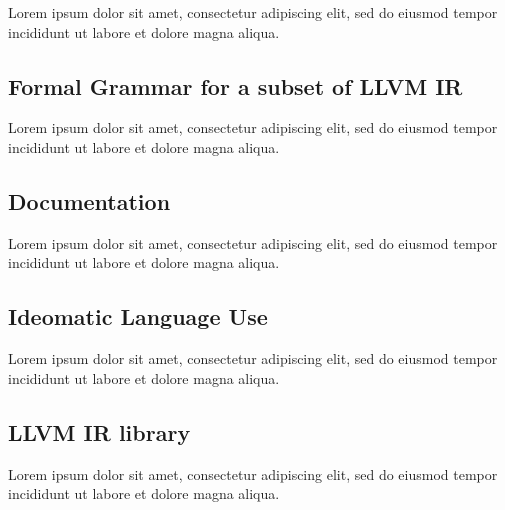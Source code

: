 \documentclass[12pt, a4paper]{article}
\begin{document}

Lorem ipsum dolor sit amet, consectetur adipiscing elit, sed do eiusmod tempor incididunt ut labore et dolore magna aliqua.


\subsection{Formal Grammar for a subset of LLVM IR}


Lorem ipsum dolor sit amet, consectetur adipiscing elit, sed do eiusmod tempor incididunt ut labore et dolore magna aliqua.


\subsection{Documentation}


Lorem ipsum dolor sit amet, consectetur adipiscing elit, sed do eiusmod tempor incididunt ut labore et dolore magna aliqua.


\subsection{Ideomatic Language Use}

Lorem ipsum dolor sit amet, consectetur adipiscing elit, sed do eiusmod tempor incididunt ut labore et dolore magna aliqua.


\subsection{LLVM IR library}

Lorem ipsum dolor sit amet, consectetur adipiscing elit, sed do eiusmod tempor incididunt ut labore et dolore magna aliqua.
\end{document}
